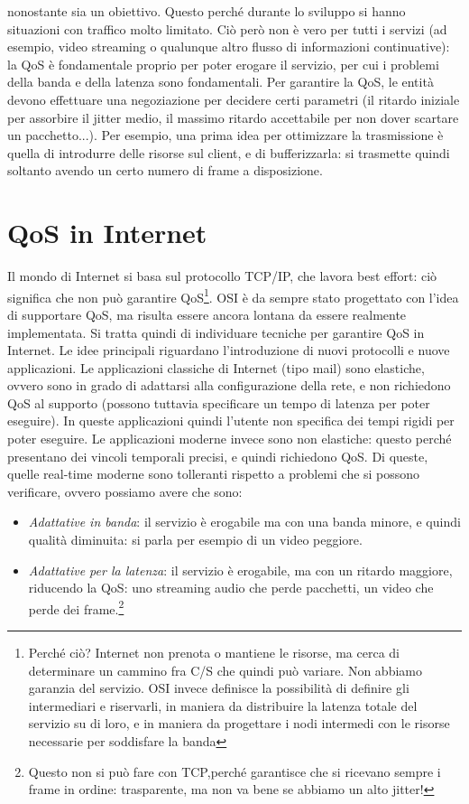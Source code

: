 nonostante sia un obiettivo. Questo
perché durante lo sviluppo si hanno situazioni con traffico molto limitato. Ciò
però non è vero per tutti i servizi
(ad esempio, video streaming o qualunque altro flusso di informazioni
continuative): la QoS è fondamentale proprio per
poter erogare il servizio, per cui i problemi della banda e della latenza sono
fondamentali. Per garantire la QoS, le
entità devono effettuare una negoziazione per decidere certi parametri (il
ritardo iniziale per assorbire il jitter
medio, il massimo ritardo accettabile per non dover scartare un pacchetto...).
Per esempio, una prima idea per
ottimizzare la trasmissione è quella di introdurre delle risorse sul client, e
di bufferizzarla: si trasmette quindi
soltanto avendo un certo numero di frame a disposizione.
\section{QoS in Internet}
Il mondo di Internet si basa sul protocollo TCP/IP, che lavora best effort: ciò
significa che non può garantire
QoS\footnote{Perché ciò? Internet non prenota o mantiene le risorse, ma cerca di
determinare un cammino fra C/S che
quindi può variare. Non abbiamo garanzia del servizio. OSI invece definisce la
possibilità di definire gli intermediari e riservarli, in maniera da distribuire
la latenza totale del servizio su di loro, e in maniera da progettare i nodi
intermedi con le risorse necessarie per soddisfare la banda}. OSI è da sempre
stato progettato con l'idea di supportare QoS, ma risulta essere ancora lontana
da essere realmente implementata. Si tratta quindi di individuare tecniche per
garantire QoS in Internet. Le idee principali riguardano l'introduzione di nuovi
protocolli e nuove applicazioni.
Le applicazioni classiche di Internet (tipo mail) sono elastiche, ovvero sono in
grado di adattarsi alla configurazione
della rete, e non richiedono QoS al supporto (possono tuttavia specificare un
tempo di latenza per poter eseguire).
In queste applicazioni quindi l'utente non specifica dei tempi rigidi per poter
eseguire.
Le applicazioni moderne invece sono non elastiche: questo perché presentano dei
vincoli temporali precisi, e quindi
richiedono QoS. Di queste, quelle real-time moderne sono tolleranti rispetto a
problemi che si possono verificare,
ovvero possiamo avere che sono:
\begin{itemize}
 \item \textit{Adattative in banda}: il servizio è erogabile ma con una banda
minore, e quindi qualità diminuita: si
 parla per esempio di un video peggiore.
 \item \textit{Adattative per la latenza}: il servizio è erogabile, ma con un
ritardo maggiore, riducendo la QoS: uno
 streaming  audio che perde pacchetti, un video che perde dei
frame.\footnote{Questo non si può fare con TCP,perché
garantisce  che si ricevano sempre i frame in ordine: trasparente, ma non va
bene se abbiamo un alto jitter!}
\end{itemize}

